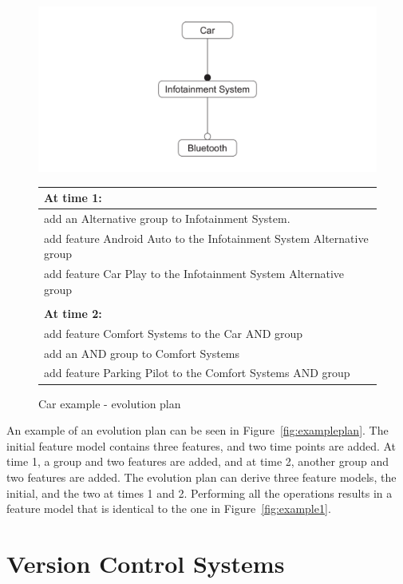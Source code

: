 \documentclass[a4paper,english]{ifimaster}
\begin{document}
\begin{figure}[htpb]
	\centering
	\includegraphics[width=0.8\linewidth]{illustrations/initial.pdf}
	\begin{tabular}{l}
		\textbf{At time 1:}                                           \\ \hline
		add an Alternative group to Infotainment System.                      \\
		add feature Android Auto to the Infotainment System Alternative group \\
		add feature Car Play to the Infotainment System Alternative group     \\
		\\
		\textbf{At time 2:}                                           \\ \hline
		add feature Comfort Systems to the Car AND group              \\
		add an AND group to Comfort Systems                           \\
		add feature Parking Pilot to the Comfort Systems AND group
	\end{tabular}
	\caption{Car example - evolution plan}%
	\label{fig:exampleplan}
\end{figure}

An example of an evolution plan can be seen in Figure~\vref{fig:exampleplan}. The initial feature model contains three features, and two time points are added. At time 1, a group and two features are added, and at time 2, another group and two features are added. The evolution plan can derive three feature models, the initial, and the two at times 1 and 2. Performing all the operations results in a feature model that is identical to the one in Figure~\vref{fig:example1}.

\section{Version Control Systems}%
\label{sec:version_control_systems}
\end{document}
